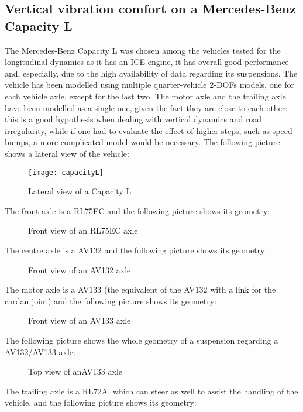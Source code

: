 \documentclass{article}
\begin{document}
\subsection{Vertical vibration comfort on a Mercedes-Benz Capacity L}
The Mercedes-Benz Capacity L was chosen among the vehicles tested for the longitudinal dynamics as it has an ICE engine, it has overall good performance and, especially, due to the high availability of data regarding its suspensions. The vehicle has been modelled using multiple quarter-vehicle 2-DOFs models, one for each vehicle axle, except for the last two. The motor axle and the trailing axle have been modelled as a single one, given the fact they are close to each other: this is a good hypothesis when dealing with vertical dynamics and road irregularity, while if one had to evaluate the effect of higher steps, such as speed bumps, a more complicated model would be necessary. The following picture shows a lateral view of the vehicle: 
\begin{figure}[H]
\centering
\texttt{[image: capacityL]}
\caption{Lateral view of a Capacity L}
\end{figure}
The front axle is a RL75EC and the following picture shows its geometry: 
\begin{figure}[H]
\makebox[\textwidth][c]{\texttt{[image: RL75EC]}}
\caption{Front view of an RL75EC axle}
\end{figure}
\newpage
The centre axle is a AV132 and the following picture shows its geometry: 
\begin{figure}[H]
\makebox[\textwidth][c]{\texttt{[image: AV132]}}
\caption{Front view of an AV132 axle}
\end{figure}
The motor axle is a AV133 (the equivalent of the AV132 with a link for the cardan joint) and the following picture shows its geometry: 
\begin{figure}[H]
\makebox[\textwidth][c]{\texttt{[image: AV133]}}
\caption{Front view of an AV133 axle}
\end{figure}
\newpage
The following picture shows the whole geometry of a suspension regarding a AV132/AV133 axle: 
\begin{figure}[H]
\caption{Top view of anAV133 axle}
\end{figure}
The trailing axle is a RL72A, which can steer as well to assist the handling of the vehicle, and the following picture shows its geometry: 
\end{document}
